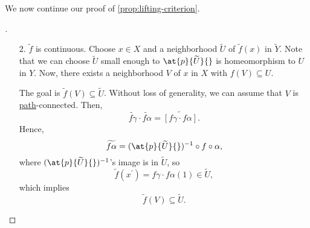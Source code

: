 We now continue our proof of \autoref{prop:lifting-criterion}.
\begin{proof}[\unskip\nopunct]
	\begin{enumerate}
		\item[2.] \(\widetilde{f} \) is continuous. Choose \(x\in X\) and a neighborhood \(\widetilde{U} \) of
			\(\widetilde{f} (x)\) in \(\widetilde{Y} \). Note that we can choose \(\widetilde{U} \) small enough to \(\at{p}{\widetilde{U} }{} \) is homeomorphism
			to \(U\) in \(Y\). Now, there exists a neighborhood \(V\) of \(x\) in \(X\) with \(f(V)\subseteq U\).
			\begin{figure}[H]
				\centering
				\label{fig:pf:prop:lifting-criterion-2}
			\end{figure}
			The goal is \(\widetilde{f} (V)\subseteq \widetilde{U}\). Without loss of generality, we can assume that
			\(V\) is \hyperref[def:path]{path}-connected. Then,
			\[
				\widetilde{f \gamma } \cdot \widetilde{f \alpha } = \widetilde{\left[f \gamma \cdot f \alpha \right]}.
			\]
			Hence,
			\[
				\widetilde{f \alpha } = (\at{p}{\widetilde{U} }{})^{-1} \circ f\circ \alpha,
			\]
			where \((\at{p}{\widetilde{U} }{})^{-1}\)'s image is in \(\widetilde{U} \), so
			\[
				\widetilde{f} (x ^\prime ) = f \gamma \cdot f \alpha (1)\in \widetilde{U},
			\]
			which implies
			\[
				\widetilde{f} (V)\subseteq \widetilde{U}.
			\]
	\end{enumerate}
\end{proof}

